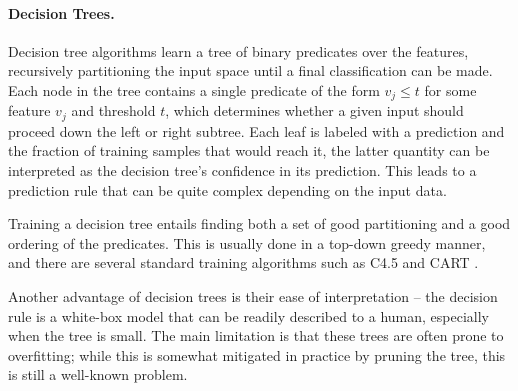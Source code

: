 \paragraph{Decision Trees.} Decision tree algorithms learn a tree of binary predicates over the features, recursively partitioning the input space until a final
classification can be made. Each node in the tree contains a single predicate of the form
$v_j \leq t$ for some feature $v_j$ and threshold $t$, which determines
whether a given input should proceed down the left or right subtree.
Each leaf is labeled with a prediction and the fraction of training
samples that would reach it, the latter quantity can be interpreted as
the decision tree's confidence in its prediction. This leads to a prediction rule
that can be quite complex depending on the input data. 

Training a decision tree entails finding both a set of good partitioning and a good ordering of the predicates. This is usually done in a top-down greedy manner, and there are several standard training algorithms such as C4.5
\citep{Quinlan1993-de} and CART \citep{Breiman1984-qy}.

Another advantage of decision trees is their ease of interpretation --  the decision rule is a white-box model that can be readily described to a human, especially when the tree is small. The main limitation is that these trees are often prone to overfitting; while this is somewhat mitigated in practice by pruning the tree, this is still a well-known problem.


%
%
%

%
%

